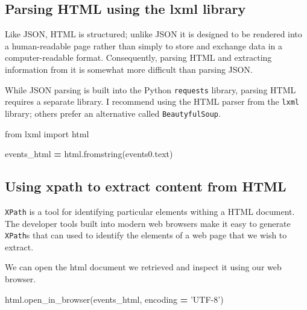 \documentclass[]{book}
\newenvironment{Shaded}{\begin{snugshade}}{\end{snugshade}}
\newcommand{\StringTok}[1]{\textcolor[rgb]{0.31,0.60,0.02}{#1}}
\newcommand{\ImportTok}[1]{#1}
\newcommand{\OperatorTok}[1]{\textcolor[rgb]{0.81,0.36,0.00}{\textbf{#1}}}
\newcommand{\NormalTok}[1]{#1}
\begin{document}
\subsection{Parsing HTML using the lxml
library}\label{parsing-html-using-the-lxml-library}

Like JSON, HTML is structured; unlike JSON it is designed to be rendered
into a human-readable page rather than simply to store and exchange data
in a computer-readable format. Consequently, parsing HTML and extracting
information from it is somewhat more difficult than parsing JSON.

While JSON parsing is built into the Python \texttt{requests} library,
parsing HTML requires a separate library. I recommend using the HTML
parser from the \texttt{lxml} library; others prefer an alternative
called \texttt{BeautyfulSoup}.

\begin{Shaded}
\begin{Highlighting}[]
\ImportTok{from}\NormalTok{ lxml }\ImportTok{import}\NormalTok{ html}

\NormalTok{events_html }\OperatorTok{=}\NormalTok{ html.fromstring(events0.text)}
\end{Highlighting}
\end{Shaded}

\subsection{Using xpath to extract content from
HTML}\label{using-xpath-to-extract-content-from-html}

\texttt{XPath} is a tool for identifying particular elements withing a
HTML document. The developer tools built into modern web browsers make
it easy to generate \texttt{XPath}s that can used to identify the
elements of a web page that we wish to extract.

We can open the html document we retrieved and inspect it using our web
browser.

\begin{Shaded}
\begin{Highlighting}[]
\NormalTok{html.open_in_browser(events_html, encoding }\OperatorTok{=} \StringTok{'UTF-8'}\NormalTok{)}
\end{Highlighting}
\end{Shaded}
\end{document}
